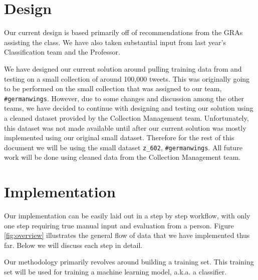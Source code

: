\section{Design}
Our current design is based primarily off of recommendations from the GRAs assisting the class. We have also taken substantial input from last year's Classification team \cite{cui2015classification} and the Professor.

We have designed our current solution around pulling training data from and testing on a small collection of around 100,000 tweets. This was originally going to be performed on the small collection that was assigned to our team, \texttt{\#germanwings}. However, due to some changes and discussion among the other teams, we have decided to continue with designing and testing our solution using a cleaned dataset provided by the Collection Management team. Unfortunately, this dataset was not made available until after our current solution was mostly implemented using our original small dataset. Therefore for the rest of this document we will be using the small dataset \texttt{z\_602}, \texttt{\#germanwings}. All future work will be done using cleaned data from the Collection Management team.

\section{Implementation}
Our implementation can be easily laid out in a step by step workflow, with only one step requiring true manual input and evaluation from a person. Figure \ref{fig:overview} illustrates the general flow of data that we have implemented thus far. Below we will discuss each step in detail.

Our methodology primarily revolves around building a training set. This training set will be used for training a machine learning model, a.k.a. a classifier.

